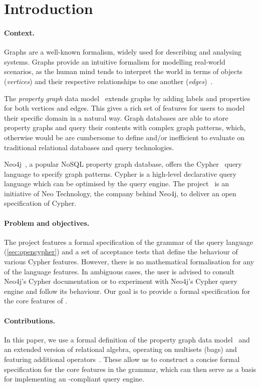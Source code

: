 \section{Introduction}
\label{sec:introduction}


\paragraph{Context.} Graphs are a well-known formalism, widely used for describing and analysing systems. Graphs provide an intuitive formalism for modelling real-world scenarios, as the human mind tends to interpret the world in terms of objects (\emph{vertices}) and their respective relationships to one another (\emph{edges})~\cite{CollectivelyGeneratedModel}. 

The \emph{property graph} data model~\cite{DBLP:books/igi/Sakr11/RodriguezN11} extends graphs by adding labels and properties for both vertices and edges. This gives a rich set of features for users to model their specific domain in a natural way. Graph databases are able to store property graphs and query their contents with complex graph patterns, which, otherwise would be are cumbersome to define and/or inefficient to evaluate on traditional relational databases and query technologies.

Neo4j~\cite{Neo4j}, a popular NoSQL property graph database, offers the Cypher~\cite{Cypher} query language to specify graph patterns. Cypher is a high-level declarative query language which can be optimised by the query engine. The \opencypher project~\cite{openCypher} is an initiative of Neo Technology, the company behind Neo4j, to deliver an open specification of Cypher.

\paragraph{Problem and objectives.} The \opencypher project features a formal specification of the grammar of the query language (\autoref{sec:opencypher}) and a set of acceptance tests that define the behaviour of various Cypher features. However, there is no mathematical formalisation for any of the language features. In ambiguous cases, the user is advised to consult Neo4j's Cypher documentation or to experiment with Neo4j's Cypher query engine and follow its behaviour. Our goal is to provide a formal specification for the core features of \opencypher.

\paragraph{Contributions.} In this paper, we use a formal definition of the property graph data model~\cite{DBLP:conf/edbt/HolschG16} and an extended version of relational algebra, operating on multisets (bags) and featuring additional operators~\cite{DBLP:books/daglib/0020812}. These allow us to construct a concise formal specification for the core features in the \opencypher grammar, which can then serve as a basis for implementing an \opencypher-compliant query engine.
